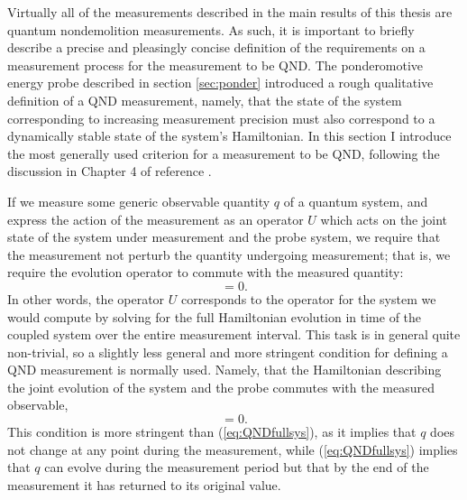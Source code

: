 Virtually all of the measurements described in the main results of this thesis are quantum nondemolition measurements.  As such, it is important to briefly describe a precise and pleasingly concise definition of the requirements on a measurement process for the measurement to be QND.  The ponderomotive energy probe described in section \ref{sec:ponder} introduced a rough qualitative definition of a QND measurement, namely, that the state of the system corresponding to increasing measurement precision must also correspond to a dynamically stable state of the system's Hamiltonian.  In this section I introduce the most generally used criterion for a measurement to be QND, following the discussion in Chapter 4 of reference \cite{Braginsky1992}.

If we measure some generic observable quantity $q$ of a quantum system, and express the action of the measurement as an operator $U$ which acts on the joint state of the system under measurement and the probe system, we require that the measurement not perturb the quantity undergoing measurement; that is, we require the evolution operator to commute with the measured quantity:
\begin{equation}
[q,U] = 0.
\label{eq:QNDfullsys}
\end{equation}
In other words, the operator $U$ corresponds to the operator for the system we would compute by solving for the full Hamiltonian evolution in time of the coupled system over the entire measurement interval.  This task is in general quite non-trivial, so a slightly less general and more stringent condition for defining a QND measurement is normally used.  Namely, that the Hamiltonian describing the joint evolution of the system and the probe commutes with the measured observable,
\begin{equation}
[q,H_{\textrm{tot}}] = 0.
\label{eq:QNDHtot}
\end{equation}
This condition is more stringent than (\ref{eq:QNDfullsys}), as it implies that $q$ does not change at any point during the measurement, while (\ref{eq:QNDfullsys}) implies that $q$ can evolve during the measurement period but that by the end of the measurement it has returned to its original value.

